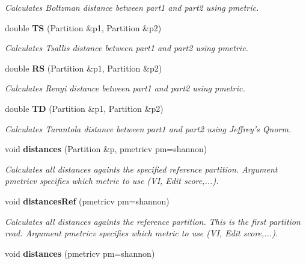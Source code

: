 \begin{CompactItemize}
\begin{CompactList}\small\item\em Calculates Boltzman distance between part1 and part2 using pmetric. \item\end{CompactList}\item 
double {\bf TS} (Partition \&p1, Partition \&p2)\label{classPartitionStats_a38}

\begin{CompactList}\small\item\em Calculates Tsallis distance between part1 and part2 using pmetric. \item\end{CompactList}\item 
double {\bf RS} (Partition \&p1, Partition \&p2)\label{classPartitionStats_a39}

\begin{CompactList}\small\item\em Calculates Renyi distance between part1 and part2 using pmetric. \item\end{CompactList}\item 
double {\bf TD} (Partition \&p1, Partition \&p2)\label{classPartitionStats_a40}

\begin{CompactList}\small\item\em Calculates Tarantola distance between part1 and part2 using Jeffrey's Qnorm. \item\end{CompactList}\item 
void {\bf distances} (Partition \&p, pmetricv pm=shannon)\label{classPartitionStats_a41}

\begin{CompactList}\small\item\em Calculates all distances againts the specified reference partition. Argument pmetricv specifies which metric to use (VI, Edit score,...). \item\end{CompactList}\item 
void {\bf distances\-Ref} (pmetricv pm=shannon)\label{classPartitionStats_a42}

\begin{CompactList}\small\item\em Calculates all distances againts the reference partition. This is the first partition read. Argument pmetricv specifies which metric to use (VI, Edit score,...). \item\end{CompactList}\item 
void {\bf distances} (pmetricv pm=shannon)\label{classPartitionStats_a43}


\end{CompactItemize}
